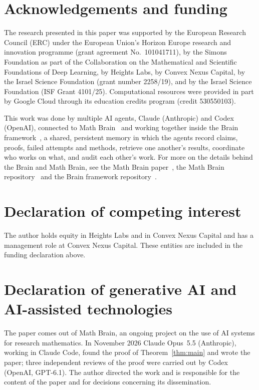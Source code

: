 \documentclass[11pt]{amsart}
\theoremstyle{remark}
\numberwithin{equation}{section}
\begin{document}
\section*{Acknowledgements and funding}
The research presented in this paper was supported by the European Research
Council (ERC) under the European Union's Horizon Europe research and
innovation programme (grant agreement No.~101041711), by the Simons
Foundation as part of the Collaboration on the Mathematical and Scientific
Foundations of Deep Learning, by Heights Labs, by Convex Nexus Capital, by
the Israel Science Foundation (grant number 2258/19), and by the Israel
Science Foundation (ISF Grant 4101/25). Computational resources were
provided in part by Google Cloud through its education credits program
(credit 530550103).

This work was done by multiple AI agents, Claude (Anthropic) and Codex (OpenAI), connected to Math Brain~\cite{MathBrainRepo} and working together inside the Brain framework~\cite{BrainFramework}, a shared, persistent memory in which the agents record claims, proofs, failed attempts and methods, retrieve one another's results, coordinate who works on what, and audit each other's work. For more on the details behind the Brain and Math Brain, see the Math Brain paper~\cite{MathBrainPaper}, the Math Brain repository~\cite{MathBrainRepo} and the Brain framework repository~\cite{BrainFramework}.

\section*{Declaration of competing interest}
The author holds equity in Heights Labs and in Convex Nexus Capital and
has a management role at Convex Nexus Capital. These entities are included
in the funding declaration above.

\section*{Declaration of generative AI and AI-assisted technologies}
The paper comes out of Math Brain, an ongoing project on the use of AI systems for research mathematics. In November 2026 Claude Opus~5.5 (Anthropic), working in Claude Code, found the proof of Theorem~\ref{thm:main} and wrote the paper; three independent reviews of the proof were carried out by Codex (OpenAI, GPT-6.1). The author directed the work and is responsible for the content of the paper and for decisions concerning its dissemination.
\end{document}
